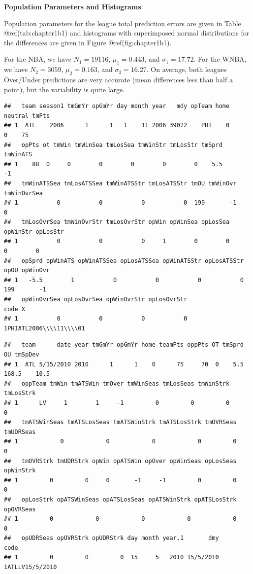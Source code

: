 \documentclass[
]{book}
\begin{document}
\textbf{Population Parameters and Histograms}

Population parameters for the league total prediction errors are given
in Table @ref(tab:chapter1b1) and histograms with superimposed normal
distributions for the differences are given in Figure
@ref(fig:chapter1b1).

For the NBA, we have \(N_1=19116\), \(\mu_1=0.443\), and
\(\sigma_1=17.72\). For the WNBA, we have \(N_2=3059\), \(\mu_2=0.163\),
and \(\sigma_2=16.27\). On average, both leagues Over/Under predictions
are very accurate (mean differences less than half a point), but the
variability is quite large.

\begin{verbatim}
##   team season1 tmGmYr opGmYr day month year   mdy opTeam home neutral tmPts
## 1  ATL    2006      1      1   1    11 2006 39022    PHI    0       0    75
##   opPts ot tmWin tmWinSea tmLosSea tmWinStr tmLosStr tmSprd tmWinATS
## 1    88  0     0        0        0        0        0    5.5       -1
##   tmWinATSSea tmLosATSSea tmWinATSStr tmLosATSStr tmOU tmWinOvr tmWinOvrSea
## 1           0           0           0           0  199       -1           0
##   tmLosOvrSea tmWinOvrStr tmLosOvrStr opWin opWinSea opLosSea opWinStr opLosStr
## 1           0           0           0     1        0        0        0        0
##   opSprd opWinATS opWinATSSea opLosATSSea opWinATSStr opLosATSStr opOU opWinOvr
## 1   -5.5        1           0           0           0           0  199       -1
##   opWinOvrSea opLosOvrSea opWinOvrStr opLosOvrStr                    code X
## 1           0           0           0           0 1PHIATL2006\\\\11\\\\01
\end{verbatim}

\begin{verbatim}
##   team      date year tmGmYr opGmYr home teamPts oppPts OT tmSprd    OU tmSpDev
## 1  ATL 5/15/2010 2010      1      1    0      75     70  0    5.5 168.5    10.5
##   oppTeam tmWin tmATSWin tmOver tmWinSeas tmLosSeas tmWinStrk tmLosStrk
## 1      LV     1        1     -1         0         0         0         0
##   tmATSWinSeas tmATSLosSeas tmATSWinStrk tmATSLosStrk tmOVRSeas tmUDRSeas
## 1            0            0            0            0         0         0
##   tmOVRStrk tmUDRStrk opWin opATSWin opOver opWinSeas opLosSeas opWinStrk
## 1         0         0     0       -1     -1         0         0         0
##   opLosStrk opATSWinSeas opATSLosSeas opATSWinStrk opATSLosStrk opOVRSeas
## 1         0            0            0            0            0         0
##   opUDRSeas opOVRStrk opUDRStrk day month year.1       dmy            code
## 1         0         0         0  15     5   2010 15/5/2010 1ATLLV15/5/2010
\end{verbatim}
\end{document}
